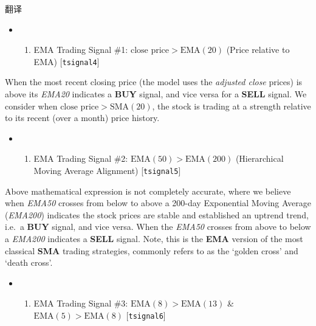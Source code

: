 \documentclass[
]{book}
\providecommand{\tightlist}{%
  \setlength{\itemsep}{0pt}\setlength{\parskip}{0pt}}
\begin{document}
翻译

\begin{itemize}
\item
  \begin{enumerate}
  \def\labelenumi{\arabic{enumi}.}
  \tightlist
  \item
    EMA Trading Signal \#1: \(\text{close price}>\text{EMA}(20)\) (Price
    relative to EMA) {[}\texttt{tsignal4}{]}
  \end{enumerate}
\end{itemize}

When the most recent closing price (the model uses the \emph{adjusted
close} prices) is above its \emph{EMA20} indicates a \textbf{BUY}
signal, and vice versa for a \textbf{SELL} signal. We consider when
\(\text{close price}>\text{SMA}(20)\), the stock is trading at a
strength relative to its recent (over a month) price history.

\begin{itemize}
\item
  \begin{enumerate}
  \def\labelenumi{\arabic{enumi}.}
  \setcounter{enumi}{1}
  \tightlist
  \item
    EMA Trading Signal \#2: \(\text{EMA}(50)>\text{EMA}(200)\)
    (Hierarchical Moving Average Alignment) {[}\texttt{tsignal5}{]}
  \end{enumerate}
\end{itemize}

Above mathematical expression is not completely accurate, where we
believe when \emph{EMA50} crosses from below to above a 200-day
Exponential Moving Average (\emph{EMA200}) indicates the stock prices
are stable and established an uptrend trend, i.e.~a \textbf{BUY} signal,
and vice versa. When the \emph{EMA50} crosses from above to below a
\emph{EMA200} indicates a \textbf{SELL} signal. Note, this is the
\textbf{EMA} version of the most classical \textbf{SMA} trading
strategies, commonly refers to as the `golden cross' and `death cross'.

\begin{itemize}
\item
  \begin{enumerate}
  \def\labelenumi{\arabic{enumi}.}
  \setcounter{enumi}{2}
  \tightlist
  \item
    EMA Trading Signal \#3: \(\text{EMA}(8)>\text{EMA}(13)\) \&
    \(\text{EMA}(5)>\text{EMA}(8)\) {[}\texttt{tsignal6}{]}
  \end{enumerate}
\end{itemize}
\end{document}
